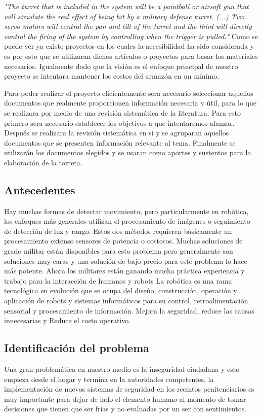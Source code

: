 \textit{"The turret that is included in the system will be a paintball or airsoft gun that will simulate the real effect of being hit by a military defense turret. (...) Two servo motors will control the pan and tilt of the turret and the third will directly control the firing of the system by controlling when the trigger is pulled."} \cite{AutonomousTurret} Como se puede ver ya existe proyectos en los cuales la accesibilidad ha sido considerada y es por esto que se utilizaran dichos artículos o proyectos para basar los materiales necesarios. Igualmente dado que la visión es el enfoque principal de nuestro proyecto se intentara mantener los costos del armazón en un mínimo. 

Para poder realizar el proyecto eficientemente sera necesario seleccionar aquellos documentos que realmente proporcionen información necesaria y útil, para lo que se realizara por medio de una revisión sistemática de la literatura. Para esto primero sera necesario establecer los objetivos a que intentaremos alanzar. Después se realizara la revisión sistemática en si y se agruparan aquellos documentos que se presenten información relevante al tema. Finalmente se utilizarán los documentos elegidos y se usaran como aportes y sustentos para la elaboración de la torreta.

\subsection*{Antecedentes}

Hay muchas formas de detectar movimiento, pero particularmente en robótica, los enfoques más generales utilizan el procesamiento de imágenes o seguimiento de detección de luz y rango.
Estos dos métodos requieren básicamente un procesamiento extenso sensores de potencia o costosos. Muchas soluciones de grado militar están disponibles para esto problema pero generalmente son soluciones muy caras y una solución de bajo precio para este problema lo hace más potente. Ahora los militares están ganando mucha práctica experiencia y trabajo para la interacción de humanos y robots La robótica es una rama tecnológica en evolución que se ocupa del diseño, construcción, operación y aplicación de robots y sistemas informáticos para su control, retroalimentación sensorial y procesamiento de información. Mejora la seguridad, reduce las causas innecesarias y Reduce el costo operativo.

\subsection*{Identificación del problema}
Una gran problemática en nuestro medio es la inseguridad ciudadana y esto empieza desde el hogar y termina en la autoridades competentes, la implementación de nuevos sistemas de seguridad en los recintos penitenciarios es muy importante para dejar de lado el elemento humano al momento de tomar decisiones que tienen que ser frías y no evaluadas por un ser con sentimientos.

